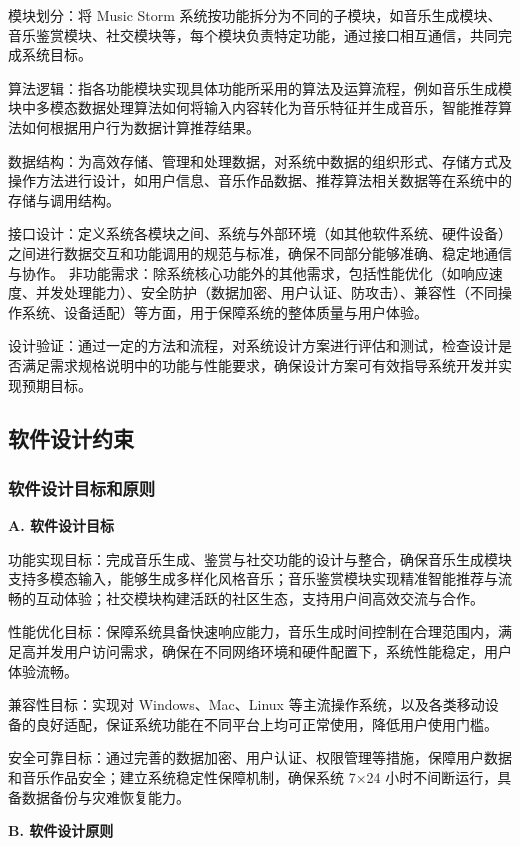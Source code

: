 \documentclass{base}
\begin{document}
模块划分：将 Music Storm 系统按功能拆分为不同的子模块，如音乐生成模块、音乐鉴赏模块、社交模块等，每个模块负责特定功能，通过接口相互通信，共同完成系统目标。​

算法逻辑：指各功能模块实现具体功能所采用的算法及运算流程，例如音乐生成模块中多模态数据处理算法如何将输入内容转化为音乐特征并生成音乐，智能推荐算法如何根据用户行为数据计算推荐结果。​

数据结构：为高效存储、管理和处理数据，对系统中数据的组织形式、存储方式及操作方法进行设计，如用户信息、音乐作品数据、推荐算法相关数据等在系统中的存储与调用结构。​

接口设计：定义系统各模块之间、系统与外部环境（如其他软件系统、硬件设备）之间进行数据交互和功能调用的规范与标准，确保不同部分能够准确、稳定地通信与协作。
非功能需求：除系统核心功能外的其他需求，包括性能优化（如响应速度、并发处理能力）、安全防护（数据加密、用户认证、防攻击）、兼容性（不同操作系统、设备适配）等方面，用于保障系统的整体质量与用户体验。​

设计验证：通过一定的方法和流程，对系统设计方案进行评估和测试，检查设计是否满足需求规格说明中的功能与性能要求，确保设计方案可有效指导系统开发并实现预期目标。

\subsection{软件设计约束}

\subsubsection{软件设计目标和原则}

\textbf{A. 软件设计目标​}

功能实现目标：完成音乐生成、鉴赏与社交功能的设计与整合，确保音乐生成模块支持多模态输入，能够生成多样化风格音乐；音乐鉴赏模块实现精准智能推荐与流畅的互动体验；社交模块构建活跃的社区生态，支持用户间高效交流与合作。

性能优化目标：保障系统具备快速响应能力，音乐生成时间控制在合理范围内，满足高并发用户访问需求，确保在不同网络环境和硬件配置下，系统性能稳定，用户体验流畅。

兼容性目标：实现对 Windows、Mac、Linux 等主流操作系统，以及各类移动设备的良好适配，保证系统功能在不同平台上均可正常使用，降低用户使用门槛。​

安全可靠目标：通过完善的数据加密、用户认证、权限管理等措施，保障用户数据和音乐作品安全；建立系统稳定性保障机制，确保系统 7×24 小时不间断运行，具备数据备份与灾难恢复能力。​

\textbf{B. 软件设计原则​}
\end{document}
